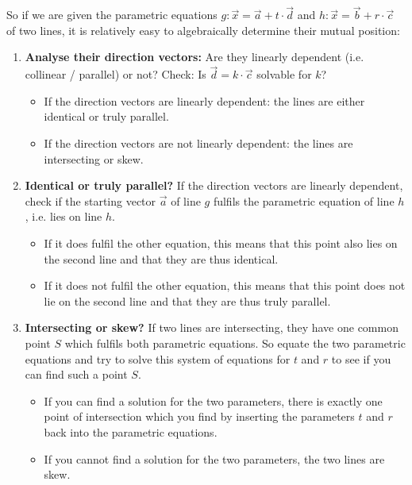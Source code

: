 \documentclass[12pt,eng]{skript_ogg}
\begin{document}
So if we are given the parametric equations $g:\vec{x}=\vec{a}+t\cdot\vec{d}$ and $h:\vec{x}=\vec{b}+r\cdot\vec{c}$ of two lines, it is relatively easy to algebraically determine their mutual position:
\begin{enumerate}
	\item \textbf{Analyse their direction vectors:} Are they linearly dependent (i.e. collinear / parallel) or not? Check: Is $\vec{d}=k\cdot\vec{c}$ solvable for $k$?
	\begin{itemize}
	\setlength{\itemsep}{-1ex}
		\item If the direction vectors are linearly dependent: the lines are either identical or truly parallel.
		\item If the direction vectors are not linearly dependent: the lines are intersecting or skew.
	\end{itemize}
	
	\item \textbf{Identical or truly parallel?} If the direction vectors are linearly dependent, check if the starting vector $\vec{a}$ of line $g$ fulfils the parametric equation of line $h$, i.e. lies on line $h$.
		\begin{itemize}
		\setlength{\itemsep}{-1ex}
		\item If it does fulfil the other equation, this means that this point also lies on the second line and that they are thus identical.
		\item If it does not fulfil the other equation, this means that this point does not lie on the second line and that they are thus truly parallel.
	\end{itemize}
	
	\item \textbf{Intersecting or skew?} If two lines are intersecting, they have one common point $S$ which fulfils both parametric equations. So equate the two parametric equations and try to solve this system of equations for $t$ and $r$ to see if you can find such a point $S$.
	\begin{itemize}
	\setlength{\itemsep}{-1ex}
		\item If you can find a solution for the two parameters, there is exactly one point of intersection which you find by inserting the parameters $t$ and $r$ back into the parametric equations.
		\item If you cannot find a solution for the two parameters, the two lines are skew.
	\end{itemize}
	\end{enumerate}
	
\end{document}
